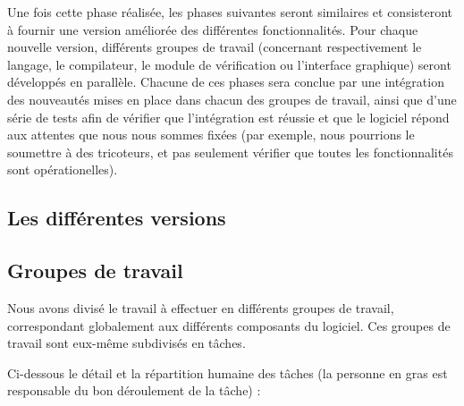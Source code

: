 \documentclass{article}
\begin{document}
Une fois cette phase réalisée, les phases suivantes seront similaires et consisteront à fournir une version améliorée des 
différentes fonctionnalités. Pour chaque nouvelle version, différents groupes de travail (concernant respectivement le langage, le 
compilateur, le module de vérification ou l'interface graphique) seront développés en parallèle. Chacune de ces phases sera conclue 
par une intégration des nouveautés mises en place dans chacun des groupes de travail, ainsi que d'une série de tests afin de vérifier que 
l'intégration est réussie et que le logiciel répond aux attentes que nous nous sommes fixées (par exemple, nous pourrions le soumettre
à des tricoteurs, et pas seulement vérifier que toutes les fonctionnalités sont opérationelles).


\subsection{Les différentes versions}


\subsection{Groupes de travail\label{workpackages}}

Nous avons divisé le travail à effectuer en différents groupes de travail, correspondant globalement aux différents composants du 
logiciel. Ces groupes de travail sont eux-même subdivisés en tâches.

Ci-dessous le détail et la répartition humaine des tâches (la personne en gras est responsable du bon déroulement de la tâche) :
\end{document}
